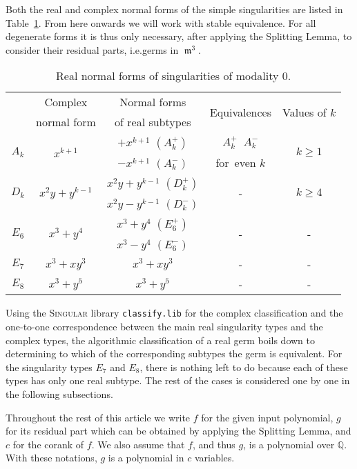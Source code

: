 \documentclass[noend]{amsproc}
\theoremstyle{definition}
\newcommand{\classify}{\texttt{classify.lib}}
\DeclareMathOperator{\requiv}{\overset{r}{\sim}}
\DeclareMathOperator{\m}{\mathfrak{m}}
\begin{document}
Both the real and complex normal forms of the simple singularities are listed
in Table~\ref{tab:normal_forms}. From here onwards we will work with stable
equivalence. For all degenerate forms it is thus only necessary, after
applying the Splitting Lemma, to consider their residual parts, i.e.\@ germs in $\m^3$.

\begin{table}[!htb]
\centering
\caption{Real normal forms of singularities of modality $0$.}
\label{tab:normal_forms}
\begin{tabular}{|c|c|c|c|c|}
\hline
& Complex & Normal forms & \multirow{2}{*}{Equivalences} &
\multirow{2}{*}{Values of $k$} \\
& normal form & of real subtypes & & \\
\hline
\multirow{2}{*}{$A_k$} & \multirow{2}{*}{$x^{k+1}$} & $+x^{k+1}$ $(A_k^+)$ &
$A_k^+ \requiv A_k^-$ & \multirow{2}{*}{$k \geq 1$} \\
& & $-x^{k+1}$ $(A_k^-)$ & for~even $k$ & \\
\hline
\multirow{2}{*}{$D_k$} & \multirow{2}{*}{$x^2y+y^{k-1}$} &
$x^2y+y^{k-1}$ $(D_k^+)$ & \multirow{2}{*}{-} &
\multirow{2}{*}{$k \geq 4$} \\
& & $x^2y-y^{k-1}$ $(D_k^-)$ & & \\
\hline
\multirow{2}{*}{$E_6$} & \multirow{2}{*}{$x^3+y^4$} & $x^3+y^4$ $(E_6^+)$ &
\multirow{2}{*}{-} & \multirow{2}{*}{-} \\
& & $x^3-y^4$ $(E_6^-)$ & & \\
\hline
$E_7$ & $x^3+xy^3$ & $x^3+xy^3$ & - & - \\
\hline
$E_8$ & $x^3+y^5$ & $x^3+y^5$ & - & - \\
\hline
\end{tabular}
\end{table}

Using the \textsc{Singular} library \classify{} \citep{classify} for the
complex classification and the one-to-one correspondence between the main real
singularity types and the complex types, the algorithmic classification of a
real germ boils down to determining to which of the corresponding subtypes the
germ is equivalent. For the singularity types $E_7$ and $E_8$, there is nothing
left to do because each of these types has only one real subtype. The rest of
the cases is considered one by one in the following subsections.

Throughout the rest of this article we write $f$ for the given input
polynomial, $g$ for its residual part which can be obtained by applying the
Splitting Lemma, and $c$ for the corank of $f$. We also assume that $f$, and
thus $g$, is a polynomial over $\mathbb Q$. With these notations, $g$ is a
polynomial in $c$ variables.
\end{document}
